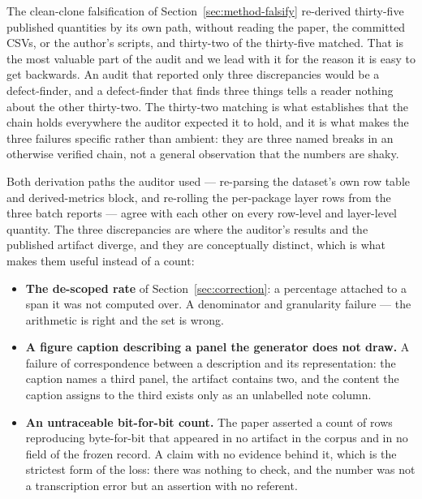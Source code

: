 \documentclass[sigconf,review]{acmart}
\begin{document}
The clean-clone falsification of Section~\ref{sec:method-falsify} re-derived
thirty-five published quantities by its own path, without reading the paper,
the committed CSVs, or the author's scripts, and thirty-two of the thirty-five
matched. That is the most valuable part of the audit and we lead with it for
the reason it is easy to get backwards. An audit that reported only three
discrepancies would be a defect-finder, and a defect-finder that finds three
things tells a reader nothing about the other thirty-two. The thirty-two
matching is what establishes that the chain holds everywhere the auditor
expected it to hold, and it is what makes the three failures specific rather
than ambient: they are three named breaks in an otherwise verified chain, not
a general observation that the numbers are shaky.

Both derivation paths the auditor used --- re-parsing the dataset's own row
table and derived-metrics block, and re-rolling the per-package layer rows from
the three batch reports --- agree with each other on every row-level and
layer-level quantity. The three discrepancies are where the auditor's results
and the published artifact diverge, and they are conceptually distinct, which
is what makes them useful instead of a count:

\begin{itemize}
\setlength{\topsep}{2pt}\setlength{\itemsep}{2pt}\setlength{\parsep}{0pt}

\item \textbf{The de-scoped rate} of Section~\ref{sec:correction}: a percentage
attached to a span it was not computed over. A denominator and granularity
failure --- the arithmetic is right and the set is wrong.

\item \textbf{A figure caption describing a panel the generator does not
draw.} A failure of correspondence between a description and its
representation: the caption names a third panel, the artifact contains two, and
the content the caption assigns to the third exists only as an unlabelled note
column.

\item \textbf{An untraceable bit-for-bit count.} The paper asserted a count of
rows reproducing byte-for-bit that appeared in no artifact in the corpus and in
no field of the frozen record. A claim with no evidence behind it, which is
the strictest form of the loss: there was nothing to check, and the number was
not a transcription error but an assertion with no referent.

\end{itemize}
\end{document}

